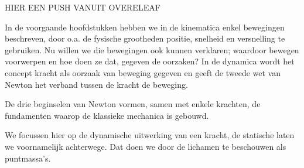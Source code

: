 \documentclass{ximera}
\begin{document}
	\author{Bart Lambregs}
    \xmsource\xmuitleg


HIER EEN PUSH VANUIT OVERELEAF 


In de voorgaande hoofdstukken hebben we in de kinematica enkel bewegingen beschreven, door o.a. de fysische grootheden positie, snelheid en versnelling te gebruiken. Nu willen we die bewegingen ook kunnen verklaren; waardoor bewegen voorwerpen en hoe doen ze dat, gegeven de oorzaken? In de dynamica wordt het concept kracht als oorzaak van beweging gegeven en geeft de tweede wet van Newton het verband tussen de kracht de beweging.

De drie beginselen van Newton vormen, samen met enkele krachten, de fundamenten waarop de klassieke mechanica is gebouwd.

We focussen hier op de dynamische uitwerking van een kracht, de statische laten we voornamelijk achterwege. Dat doen we door de lichamen te beschouwen als puntmassa's.
\end{document}
